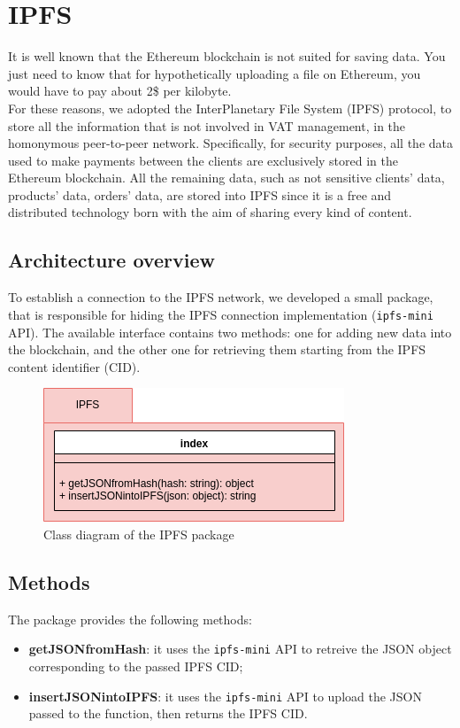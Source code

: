 \section{IPFS} 

It is well known that the Ethereum blockchain is not suited for saving data. You just need to know that for hypothetically uploading a file on Ethereum, you would have to pay about 2\$ per kilobyte. 
\\
For these reasons, we adopted the InterPlanetary File System (IPFS) protocol, to store all the information that is not involved in VAT management, in the homonymous peer-to-peer network. Specifically, for security purposes, all the data used to make payments between the clients are exclusively stored in the Ethereum blockchain. All the remaining data, such as not sensitive clients' data, products' data, orders' data, are stored into IPFS since it is a free and distributed technology born with the aim of sharing every kind of content.


\subsection{Architecture overview}

To establish a connection to the IPFS network, we developed a small package, that is responsible for hiding the IPFS connection implementation (\texttt{ipfs-mini} API). The available interface contains two methods: one for adding new data into the blockchain, and the other one for retrieving them starting from the IPFS content identifier (CID).
\begin{figure}[h]
	\centering
	\includegraphics[scale=0.6]{res/images/IPFS.png}
	\caption{Class diagram of the IPFS package}
\end{figure}
\subsection{Methods}
The package provides the following methods:
\begin{itemize}
	\item \textbf{getJSONfromHash}: it uses the \texttt{ipfs-mini} API to retreive the JSON object corresponding to the passed IPFS CID;
	\item \textbf{insertJSONintoIPFS}: it uses the \texttt{ipfs-mini} API to upload the JSON passed to the function, then returns the IPFS CID.
\end{itemize}

